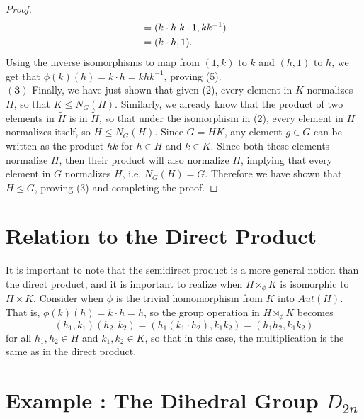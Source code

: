 \documentclass[11pt]{article}
\newcommand{\ns}{\mathrel{\unlhd}}
\begin{document}
\begin{proof}
\begin{align}
&= (k\cdot h \hspace{0.1 cm} k \cdot 1, kk^{-1}) \\
&= (k\cdot h, 1).
\end{align}
Using the inverse isomorphisms to map from $(1,k)$ to $k$ and $(h,1)$ to $h$, we get that $\phi(k)(h) = k\cdot h = khk^{-1}$, proving (5). \\
\indent
$\mathbf{(3)}$ Finally, we have just shown that given (2), every element in $K$ normalizes $H$, so that $K \le N_G (H)$. Similarly, we already know that the product of two elements in $\tilde{H}$ is in $\tilde{H}$, so that under the isomorphism in (2), every element in $H$ normalizes itself, so $H \le N_G (H)$. Since $G = HK$, any element $g \in G$ can be written as the product $hk$ for $h \in H$ and $k \in K$. SInce both these elements normalize $H$, then their product will also normalize $H$, implying that every element in $G$ normalizes $H$, i.e. $N_G(H) = G$. Therefore we have shown that $H \ns G$, proving (3) and completing the proof. 
\end{proof}

\section{Relation to the Direct Product}
It is important to note that the semidirect product is a more general notion than the direct product, and it is important to realize when $H \rtimes_{\phi} K$ is isomorphic to $H\times K$. Consider when $\phi$ is the trivial homomorphism from $K$ into $Aut(H)$. That is, $\phi(k) (h) = k \cdot h = h$, so the group operation in $H\rtimes_{\phi} K$ becomes 
\begin{equation}
(h_1, k_1) (h_2, k_2) = (h_1 (k_1 \cdot h_2), k_1 k_2) = (h_1 h_2, k_1 k_2)
\end{equation}
for all $h_1, h_2 \in H$ and $k_1, k_2 \in K$, so that in this case, the multiplication is the same as in the direct product.

\section{Example : The Dihedral Group $D_{2n}$}
\end{document}
